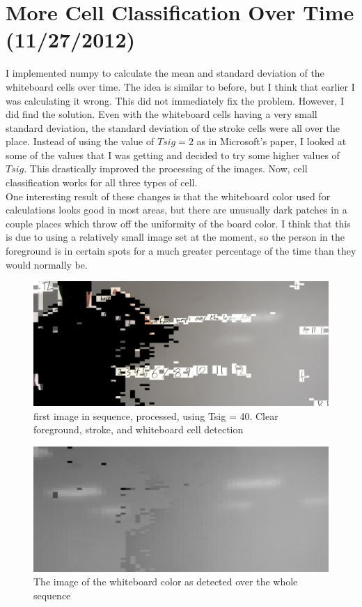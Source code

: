 \documentclass[]{article}
\begin{document}
	\section{More Cell Classification Over Time (11/27/2012)}
		I implemented numpy to calculate the mean and standard deviation of the whiteboard cells over time.  The idea is similar to before, but I think that earlier I was calculating it wrong.  This did not immediately fix the problem.  However, I did find the solution.  Even with the whiteboard cells having a very small standard deviation, the standard deviation of the stroke cells were all over the place.  Instead of using the value of $Tsig = 2$ as in Microsoft's paper, I looked at some of the values that I was getting and decided to try some higher values of $Tsig$.    This drastically improved the processing of the images.  Now, cell classification works for all three types of cell.  \\
		
		One interesting result of these changes is that the whiteboard color used for calculations looks good in most areas, but there are unusually dark patches in a couple places which throw off the uniformity of the board color.  I think that this is due to using a relatively small image set at the moment, so the person in the foreground is in certain spots for a much greater percentage of the time than they would normally be.

\begin{figure}[H]
\centering
\includegraphics[scale=0.25]{images/griffin_foreground1}
\caption{first image in sequence, processed, using Tsig = 40.  Clear foreground, stroke, and whiteboard cell detection}
\end{figure}
		
\begin{figure}[H]
\centering
\includegraphics[scale=0.25]{images/background_overtime}
\caption{The image of the whiteboard color as detected over the whole sequence}
\end{figure}	
\end{document}
